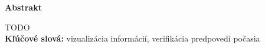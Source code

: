 \begin{Huge}
\textbf{Abstrakt}  \\
\end{Huge}

TODO\\



\textbf{Kľúčové slová:} vizualizácia informácií, verifikácia predpovedí počasia 